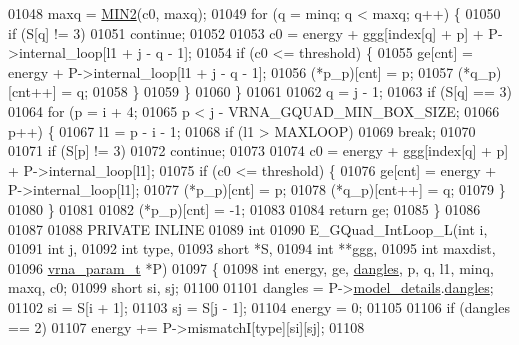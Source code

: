 \begin{DoxyCode}
01048     maxq  = \hyperlink{group__utils_gae0b9cd0ce090bd69b951aa73e8fa4f7d}{MIN2}(c0, maxq);
01049     \textcolor{keywordflow}{for} (q = minq; q < maxq; q++) \{
01050       \textcolor{keywordflow}{if} (S[q] != 3)
01051         \textcolor{keywordflow}{continue};
01052 
01053       c0 = energy + ggg[index[q] + p] + P->internal\_loop[l1 + j - q - 1];
01054       \textcolor{keywordflow}{if} (c0 <= threshold) \{
01055         ge[cnt]       = energy + P->internal\_loop[l1 + j - q - 1];
01056         (*p\_p)[cnt]   = p;
01057         (*q\_p)[cnt++] = q;
01058       \}
01059     \}
01060   \}
01061 
01062   q = j - 1;
01063   \textcolor{keywordflow}{if} (S[q] == 3)
01064     \textcolor{keywordflow}{for} (p = i + 4;
01065          p < j - VRNA\_GQUAD\_MIN\_BOX\_SIZE;
01066          p++) \{
01067       l1 = p - i - 1;
01068       \textcolor{keywordflow}{if} (l1 > MAXLOOP)
01069         \textcolor{keywordflow}{break};
01070 
01071       \textcolor{keywordflow}{if} (S[p] != 3)
01072         \textcolor{keywordflow}{continue};
01073 
01074       c0 = energy + ggg[index[q] + p] + P->internal\_loop[l1];
01075       \textcolor{keywordflow}{if} (c0 <= threshold) \{
01076         ge[cnt]       = energy + P->internal\_loop[l1];
01077         (*p\_p)[cnt]   = p;
01078         (*q\_p)[cnt++] = q;
01079       \}
01080     \}
01081 
01082   (*p\_p)[cnt] = -1;
01083 
01084   \textcolor{keywordflow}{return} ge;
01085 \}
01086 
01087 
01088 PRIVATE INLINE
01089 \textcolor{keywordtype}{int}
01090 E\_GQuad\_IntLoop\_L(\textcolor{keywordtype}{int}           i,
01091                   \textcolor{keywordtype}{int}           j,
01092                   \textcolor{keywordtype}{int}           type,
01093                   \textcolor{keywordtype}{short}         *S,
01094                   \textcolor{keywordtype}{int}           **ggg,
01095                   \textcolor{keywordtype}{int}           maxdist,
01096                   \hyperlink{group__energy__parameters_structvrna__param__s}{vrna\_param\_t}  *P)
01097 \{
01098   \textcolor{keywordtype}{int}   energy, ge, \hyperlink{group__model__details_ga72b511ed1201f7e23ec437e468790d74}{dangles}, p, q, l1, minq, maxq, c0;
01099   \textcolor{keywordtype}{short} si, sj;
01100 
01101   dangles = P->\hyperlink{group__energy__parameters_a7b84353eb9075c595bad4ceb871bcae7}{model\_details}.\hyperlink{group__model__details_adcda4ff2ea77748ae0e8700288282efc}{dangles};
01102   si      = S[i + 1];
01103   sj      = S[j - 1];
01104   energy  = 0;
01105 
01106   \textcolor{keywordflow}{if} (dangles == 2)
01107     energy += P->mismatchI[type][si][sj];
01108 

\end{DoxyCode}
